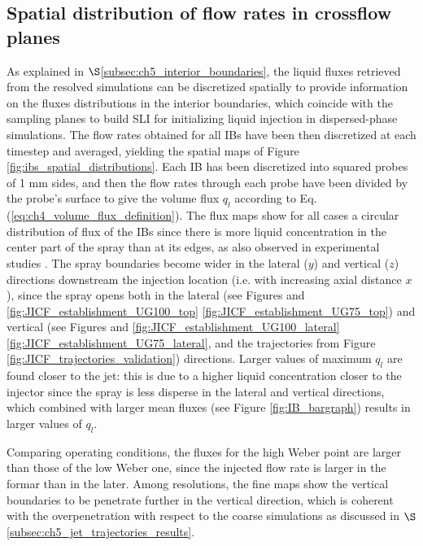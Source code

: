 \subsection{Spatial distribution of flow rates in crossflow planes}

As explained in $\S$\ref{subsec:ch5_interior_boundaries}, the liquid fluxes retrieved from the resolved simulations can be discretized spatially to provide information on the fluxes distributions in the interior boundaries, which coincide with the sampling planes to build SLI for initializing liquid injection in dispersed-phase simulations. The flow rates obtained for all IBs have been then discretized at each timestep and averaged, yielding the spatial maps of Figure \ref{fig:ibs_spatial_distributions}. Each IB has been discretized into squared probes of 1 mm sides, and then the flow rates through each probe have been divided by the probe's surface to give the volume flux $q_l$ according to Eq. (\ref{eq:ch4_volume_flux_definition}). The flux maps show for all cases a circular distribution of flux of the IBs since there is more liquid concentration in the center part of the spray than at its edges, as also observed in experimental studies .  The spray boundaries become wider in the lateral ($y$) and vertical ($z$) directions downstream the injection location (i.e. with increasing axial distance $x$), since the spray opens both in the lateral (see Figures and \ref{fig:JICF_establishment_UG100_top} \ref{fig:JICF_establishment_UG75_top}) and vertical (see Figures and \ref{fig:JICF_establishment_UG100_lateral} \ref{fig:JICF_establishment_UG75_lateral}, and the trajectories from Figure \ref{fig:JICF_trajectories_validation}) directions. Larger values of maximum $q_l$ are found closer to the jet: this is due to a higher liquid concentration closer to the injector since the spray is less disperse in the lateral and vertical directions, which combined with larger mean fluxes (see Figure \ref{fig:IB_bargraph}) results in larger values of $q_l$. 

Comparing operating conditions, the fluxes for the high Weber point are larger than those of the low Weber one, since the injected flow rate is larger in the formar than in the later. Among resolutions, the fine maps show the vertical boundaries to be penetrate further in the vertical direction, which is coherent with the overpenetration with respect to the coarse simulations as discussed in $\S$\ref{subsec:ch5_jet_trajectories_results}. 

